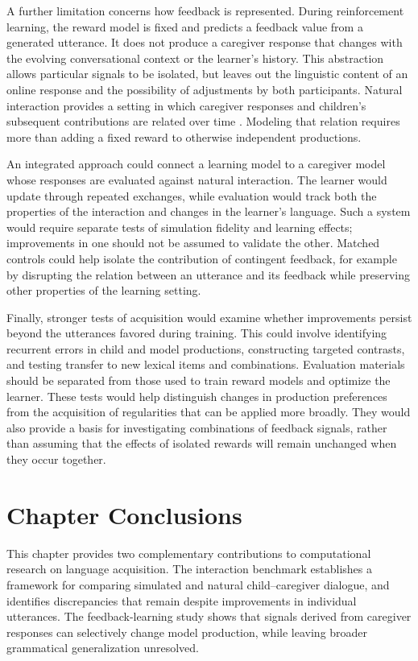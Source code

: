 A further limitation concerns how feedback is represented. During reinforcement learning, the reward model is fixed and predicts a feedback value from a generated utterance. It does not produce a caregiver response that changes with the evolving conversational context or the learner's history. This abstraction allows particular signals to be isolated, but leaves out the linguistic content of an online response and the possibility of adjustments by both participants. Natural interaction provides a setting in which caregiver responses and children's subsequent contributions are related over time \citep{masek_where_2021, fusaroli_caregiver_2023}. Modeling that relation requires more than adding a fixed reward to otherwise independent productions.

An integrated approach could connect a learning model to a caregiver model whose responses are evaluated against natural interaction. The learner would update through repeated exchanges, while evaluation would track both the properties of the interaction and changes in the learner's language. Such a system would require separate tests of simulation fidelity and learning effects; improvements in one should not be assumed to validate the other. Matched controls could help isolate the contribution of contingent feedback, for example by disrupting the relation between an utterance and its feedback while preserving other properties of the learning setting.

Finally, stronger tests of acquisition would examine whether improvements persist beyond the utterances favored during training. This could involve identifying recurrent errors in child and model productions, constructing targeted contrasts, and testing transfer to new lexical items and combinations. Evaluation materials should be separated from those used to train reward models and optimize the learner. These tests would help distinguish changes in production preferences from the acquisition of regularities that can be applied more broadly. They would also provide a basis for investigating combinations of feedback signals, rather than assuming that the effects of isolated rewards will remain unchanged when they occur together.

\section{Chapter Conclusions}

This chapter provides two complementary contributions to computational research on language acquisition. The interaction benchmark establishes a framework for comparing simulated and natural child--caregiver dialogue, and identifies discrepancies that remain despite improvements in individual utterances. The feedback-learning study shows that signals derived from caregiver responses can selectively change model production, while leaving broader grammatical generalization unresolved.

